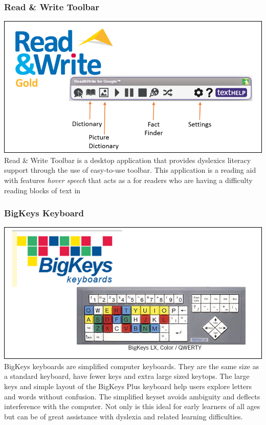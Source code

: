 \documentclass[letterpaper, 12pt, oneside]{book}
\begin{document}
\subsubsection{Read \& Write Toolbar}
\includegraphics[width=\textwidth]{toolbar}
\newline
Read \& Write Toolbar is a desktop application that provides dyslexics literacy support through the use of easy-to-use toolbar. This application is a reading aid with features \textit{hover speech} that acts as a  for readers who are having a difficulty reading blocks of text in %

\subsubsection{BigKeys Keyboard}
\includegraphics[width=\textwidth]{bkeybord}
\newline
BigKeys keyboards are simplified computer keyboards. They are the same size as a standard keyboard, have fewer keys and extra large sized keytops. The large keys and simple layout of the BigKeys Plus keyboard help users explore letters and words without confusion. The simplified keyset avoids ambiguity and deflects interference with the computer. Not only is this ideal for early learners of all ages but can be of great assistance with dyslexia and related learning difficulties.
\end{document}
